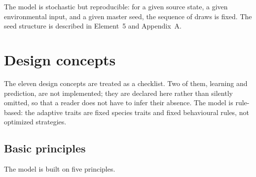 \documentclass[11pt,a4paper]{article}
\begin{document}
The model is stochastic but reproducible: for a given source state, a
given environmental input, and a given master seed, the sequence of
draws is fixed. The seed structure is described in Element~5 and
Appendix~A.

\section{Design concepts}

The eleven design concepts are treated as a checklist. Two of them,
learning and prediction, are not implemented; they are declared here
rather than silently omitted, so that a reader does not have to infer
their absence. The model is rule-based: the adaptive traits are fixed
species traits and fixed behavioural rules, not optimized strategies.

\subsection{Basic principles}

The model is built on five principles.
\end{document}
